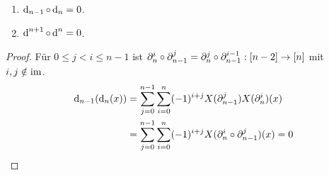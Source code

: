 \begin{lemmea}
  \begin{enumerate}[label=(\alph*)]
    \item $\operatorname{d}_{n-1}\circ \operatorname{d}_n= 0$.
    \item $\operatorname{d}^{n+1}\circ \operatorname{d}^n=0$.
  \end{enumerate}
\end{lemmea}
\begin{proof}
  Für $0\leq j< i\leq n-1$ ist
  $\partial_n^i\circ \partial_{n-1}^j = \partial_n^j\circ\partial_{n-1}^{i-1}:
  [n-2]\to[n]$ mit $i,j\notin \operatorname{im}$.
  \begin{align*}
    \operatorname{d}_{n-1}(\operatorname{d}_n(x)) &= \sum_{j=0}^{n-1}\sum_{i=0}^n (-1)^{i+j}
     X(\partial_{n-1}^j)X(\partial_n^i)(x) \\
    &= \sum_{j=0}^{n-1}\sum_{i=0}^n (-1)^{i+j} X(\partial_n^i\circ
    \partial_{n-1}^j)(x) = 0
  \end{align*}
\end{proof}
